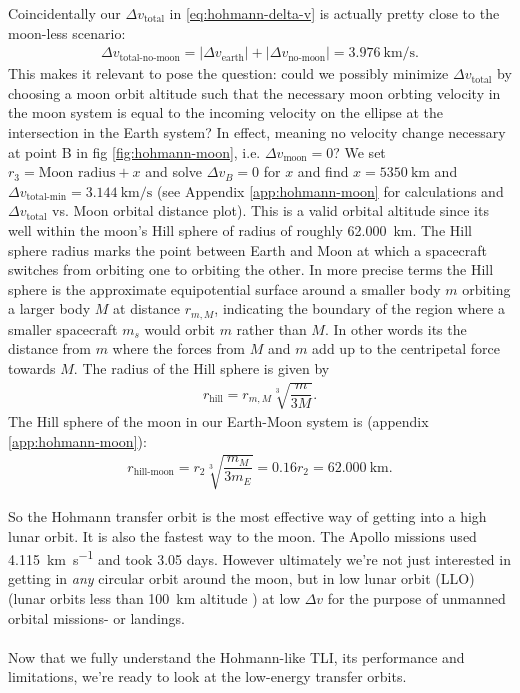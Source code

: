 Coincidentally our $\Delta v_{\text{total}}$ in \ref{eq:hohmann-delta-v} is actually pretty close to the moon-less scenario:
\begin{align}
\Delta v_{\text{total-no-moon}} = |\Delta v_{\text{earth}}| + |\Delta v_{\text{no-moon}}| = \SI{3.976}{\km\per\s}.
\end{align}
This makes it relevant to pose the question: could we possibly minimize $\Delta v_{\text{total}}$ by choosing a moon orbit altitude such that the necessary moon orbting velocity in the moon system is equal to the incoming velocity on the ellipse at the intersection in the Earth system? In effect, meaning no velocity change necessary at point B in fig \ref{fig:hohmann-moon}, i.e. $\Delta v_{\text{moon}} = 0$? We set $r_3 = \text{Moon radius} + x$ and solve $\Delta v_B = 0$ for $x$ and find $x = \SI{5350}{\km}$ and $\Delta v_\text{total-min} = \SI{3.144}{\km\per\second}$ (see Appendix \ref{app:hohmann-moon} for calculations and $\Delta v_\text{total}$ vs. Moon orbital distance plot). This is a valid orbital altitude since its well within the moon's Hill sphere of radius of roughly \SI{62,000}{\km}. The Hill sphere radius marks the point between Earth and Moon at which a spacecraft switches from orbiting one to orbiting the other. In more precise terms the Hill sphere is the approximate equipotential surface around a smaller body $m$ orbiting a larger body $M$ at distance $r_{m,M}$, indicating the boundary of the region where a smaller spacecraft $m_s$ would orbit $m$ rather than $M$. In other words its the distance from $m$ where the forces from $M$ and $m$ add up to the centripetal force towards $M$. The radius of the Hill sphere is given by \cite{Murray1999}
\begin{align}
r_{\text{hill}} = r_{m,M}\sqrt[3]{\dfrac{m}{3M}}. \label{eq:hill-sphere}
\end{align}
The Hill sphere of the moon in our Earth-Moon system is (appendix \ref{app:hohmann-moon}):
\begin{align}
r_{\text{hill-moon}} = r_2\sqrt[3]{\dfrac{m_M}{3m_E}} = 0.16 r_2 = \SI{62,000}{\km}.
\end{align}

So the Hohmann transfer orbit is the most effective way of getting into a high lunar orbit. It is also the fastest way to the moon. The Apollo missions used \SI{4.115}{\km\per\s} and took 3.05 days. However ultimately we're not just interested in getting in \emph{any} circular orbit around the moon, but in low lunar orbit (LLO) (lunar orbits less than \SI{100}{\km} altitude \cite{NASA1966}) at low $\Delta v$ for the purpose of unmanned orbital missions- or landings.\\
\\
Now that we fully understand the Hohmann-like TLI, its performance and limitations, we're ready to look at the low-energy transfer orbits.


